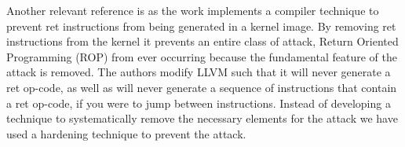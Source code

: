 \documentclass{sig-alternate-05-2015}
\begin{document}
\par Another relevant reference is \cite{li2010defeating} as the work implements a 
compiler technique to prevent ret instructions from being generated in a kernel image. 
By removing ret instructions from the kernel it prevents an entire class of attack, 
Return Oriented Programming (ROP) from ever occurring because the fundamental feature 
of the attack is removed. The authors modify LLVM such that it will never generate a ret 
op-code, as well as will never generate a sequence of instructions that contain a ret op-code, 
if you were to jump between instructions. Instead of developing a technique to systematically 
remove the necessary elements for the attack we have used a hardening technique to 
prevent the attack.



\end{document}
